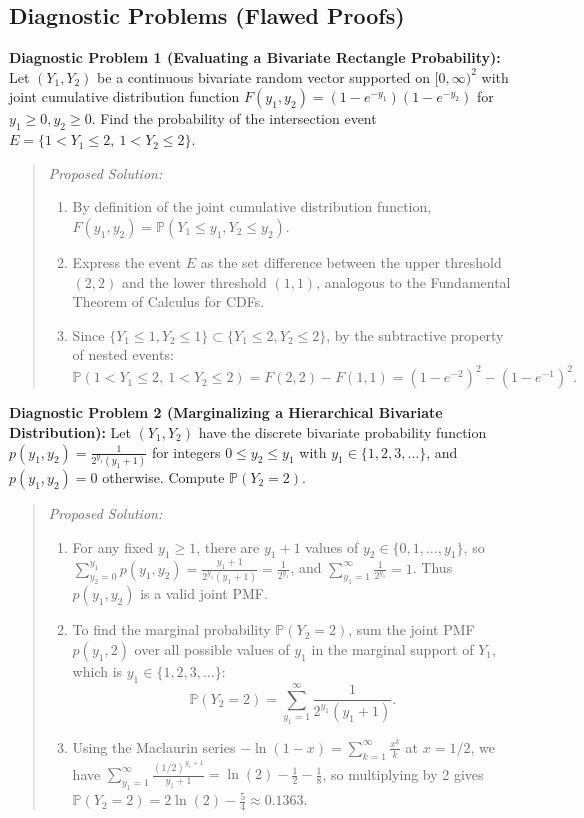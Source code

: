 \documentclass[11pt, letterpaper]{article}
\theoremstyle{definition}
\theoremstyle{remark}
\newcommand{\Prob}{\mathbb{P}}
\begin{document}
\subsection{Diagnostic Problems (Flawed Proofs)}

\textbf{Diagnostic Problem 1 (Evaluating a Bivariate Rectangle Probability):}
Let $(Y_1, Y_2)$ be a continuous bivariate random vector supported on $[0, \infty)^2$ with joint cumulative distribution function $F(y_1, y_2) = (1 - e^{-y_1})(1 - e^{-y_2})$ for $y_1 \ge 0, y_2 \ge 0$. Find the probability of the intersection event $E = \{1 < Y_1 \le 2,\ 1 < Y_2 \le 2\}$.
\begin{quote}
\emph{Proposed Solution:}
\begin{enumerate}[label=\textbf{Step \arabic*:}]
    \item By definition of the joint cumulative distribution function, $F(y_1, y_2) = \Prob(Y_1 \le y_1, Y_2 \le y_2)$.
    \item Express the event $E$ as the set difference between the upper threshold $(2, 2)$ and the lower threshold $(1, 1)$, analogous to the Fundamental Theorem of Calculus for CDFs.
    \item Since $\{Y_1 \le 1, Y_2 \le 1\} \subset \{Y_1 \le 2, Y_2 \le 2\}$, by the subtractive property of nested events:
    \[
    \Prob(1 < Y_1 \le 2,\ 1 < Y_2 \le 2) = F(2, 2) - F(1, 1) = (1 - e^{-2})^2 - (1 - e^{-1})^2.
    \]
\end{enumerate}
\end{quote}

\textbf{Diagnostic Problem 2 (Marginalizing a Hierarchical Bivariate Distribution):}
Let $(Y_1, Y_2)$ have the discrete bivariate probability function $p(y_1, y_2) = \frac{1}{2^{y_1}(y_1 + 1)}$ for integers $0 \le y_2 \le y_1$ with $y_1 \in \{1, 2, 3, \dots\}$, and $p(y_1, y_2) = 0$ otherwise. Compute $\Prob(Y_2 = 2)$.
\begin{quote}
\emph{Proposed Solution:}
\begin{enumerate}[label=\textbf{Step \arabic*:}]
    \item For any fixed $y_1 \ge 1$, there are $y_1 + 1$ values of $y_2 \in \{0, 1, \dots, y_1\}$, so $\sum_{y_2=0}^{y_1} p(y_1, y_2) = \frac{y_1+1}{2^{y_1}(y_1+1)} = \frac{1}{2^{y_1}}$, and $\sum_{y_1=1}^\infty \frac{1}{2^{y_1}} = 1$. Thus $p(y_1, y_2)$ is a valid joint PMF.
    \item To find the marginal probability $\Prob(Y_2 = 2)$, sum the joint PMF $p(y_1, 2)$ over all possible values of $y_1$ in the marginal support of $Y_1$, which is $y_1 \in \{1, 2, 3, \dots\}$:
    \[
    \Prob(Y_2 = 2) = \sum_{y_1 = 1}^{\infty} \frac{1}{2^{y_1}(y_1 + 1)}.
    \]
    \item Using the Maclaurin series $-\ln(1 - x) = \sum_{k=1}^\infty \frac{x^k}{k}$ at $x = 1/2$, we have $\sum_{y_1=1}^\infty \frac{(1/2)^{y_1+1}}{y_1+1} = \ln(2) - \frac{1}{2} - \frac{1}{8}$, so multiplying by 2 gives $\Prob(Y_2 = 2) = 2\ln(2) - \frac{5}{4} \approx 0.1363$.
\end{enumerate}
\end{quote}
\end{document}
